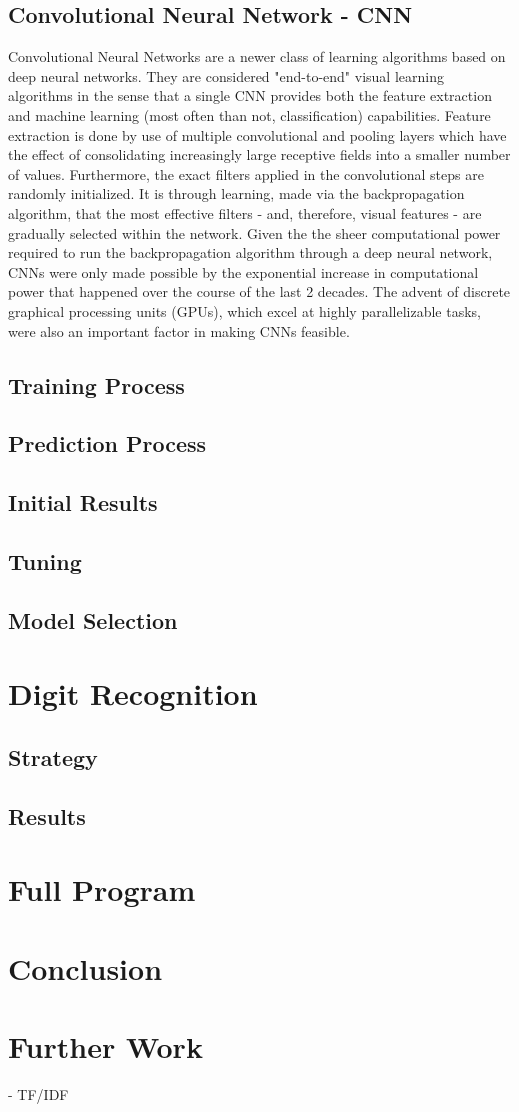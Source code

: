 \documentclass[11pt]{article}
\begin{document}
    \subsection{Convolutional Neural Network - CNN}\label{CNN}
        Convolutional Neural Networks are a newer class of learning algorithms based on deep neural networks. They are considered "end-to-end" visual learning algorithms in the sense that a single CNN provides both the feature extraction and machine learning (most often than not, classification) capabilities. Feature extraction is done by use of multiple convolutional and pooling layers which have the effect of consolidating increasingly large receptive fields into a smaller number of values. Furthermore, the exact filters applied in the convolutional steps are randomly initialized. It is through learning, made via the backpropagation algorithm, that the most effective filters - and, therefore, visual features - are gradually selected within the network. Given the the sheer computational power required to run the backpropagation algorithm through a deep neural network, CNNs were only made possible by the exponential increase in computational power that happened over the course of the last 2 decades. The advent of discrete graphical processing units (GPUs), which excel at highly parallelizable tasks, were also an important factor in making CNNs feasible.

\subsection{Training Process}
\subsection{Prediction Process}
\subsection{Initial Results}
\subsection{Tuning}
\subsection{Model Selection}
\section{Digit Recognition}
\subsection{Strategy}
\subsection{Results}
\section{Full Program}
\section{Conclusion}
\section{Further Work}
- TF/IDF
\end{document}
